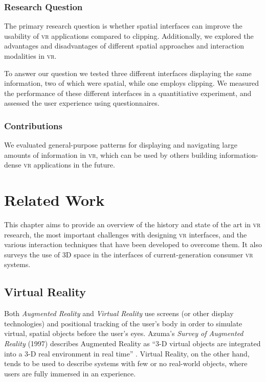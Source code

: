 \documentclass[nobib]{tufte-book} %
\begin{document}
\subsection{Research Question}
The primary research question is whether spatial interfaces can improve the usability of \textsc{vr} applications compared to clipping. Additionally, we explored the advantages and disadvantages of different spatial approaches and interaction modalities in \textsc{vr}.

To answer our question we tested three different interfaces displaying the same information, two of which were spatial, while one employs clipping. We measured the performance of these different interfaces in a quantitiative experiment, and assessed the user experience using questionnaires.

\subsection{Contributions}
We evaluated general-purpose patterns for displaying and navigating large amounts of information in \textsc{vr}, which can be used by others building information-dense \textsc{vr} applications in the future.


\chapter{Related Work}
\label{ch:related-work}

This chapter aims to provide an overview of the history and state of the art in \textsc{vr} research, the most important challenges with designing \textsc{vr} interfaces, and the various interaction techniques that have been developed to overcome them. It also surveys the use of 3D space in the interfaces of current-generation consumer \textsc{vr} systems.

\section{Virtual Reality}
Both \emph{Augmented Reality} and \emph{Virtual Reality} use screens (or other display technologies) and positional tracking of the user's body in order to simulate virtual, spatial objects before the user's eyes. Azuma's \emph{Survey of Augmented Reality} (1997) describes Augmented Reality as ``3-D virtual objects are integrated into a 3-D real environment in real time'' \cite{azuma1997survey}. Virtual Reality, on the other hand, tends to be used to describe systems with few or no real-world objects, where users are fully immersed in an experience.
\end{document}
